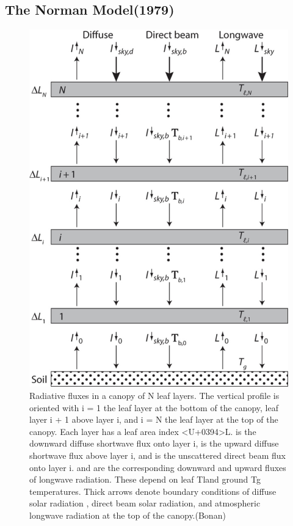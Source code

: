 \documentclass[
  oneside]{book}
\begin{document}
\hypertarget{the-norman-model1979}{%
\subsection{The Norman Model(1979)}\label{the-norman-model1979}}

\begin{figure}

{\centering \includegraphics[width=0.8\linewidth]{figures/chap3/f319_Norman} 

}

\caption{Radiative fluxes in a canopy of N leaf layers. The vertical profile is oriented with i = 1 the leaf layer at the bottom of the canopy, leaf layer i + 1 above layer i, and i = N the leaf layer at the top of the canopy. Each layer has a leaf area index <U+0394>L. is the downward diffuse shortwave flux onto layer i, is the upward diffuse shortwave flux above layer i, and is the unscattered direct beam flux onto layer i. and are the corresponding downward and upward fluxes of longwave radiation. These depend on leaf Tland ground Tg temperatures. Thick arrows denote boundary conditions of diffuse solar radiation , direct beam solar radiation, and atmospheric longwave radiation at the top of the canopy.(Bonan)}\label{fig:f319}
\end{figure}
\end{document}

